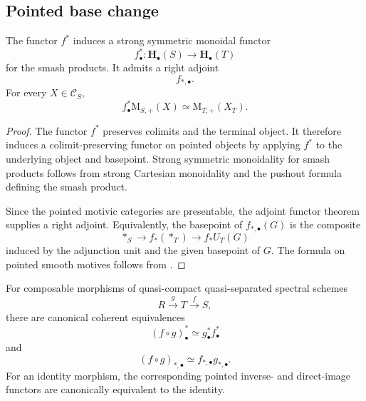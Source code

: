 \subsection{Pointed base change}

\begin{proposition}
\label{prop:pointed-motivic-base-change}
The functor \(f^*\) induces a strong symmetric monoidal functor
\[
    f^*_\bullet
    \colon
    \mathbf H_\bullet(S)
    \longrightarrow
    \mathbf H_\bullet(T)
\]
for the smash products.  It admits a right adjoint
\[
    f_{*,\bullet}.
\]
For every \(X\in\mathcal C_S\),
\[
    f^*_\bullet\mathrm M_{S,+}(X)
    \simeq
    \mathrm M_{T,+}(X_T).
\]
\end{proposition}

\begin{proof}
The functor \(f^*\) preserves colimits and the terminal object.  It
therefore induces a colimit-preserving functor on pointed objects by
applying \(f^*\) to the underlying object and basepoint.  Strong
symmetric monoidality for smash products follows from strong Cartesian
monoidality and the pushout formula defining the smash product.

Since the pointed motivic categories are presentable, the adjoint
functor theorem supplies a right adjoint.  Equivalently, the basepoint
of \(f_{*,\bullet}(G)\) is the composite
\[
    *_S
    \longrightarrow
    f_*(*_T)
    \longrightarrow
    f_*U_T(G)
\]
induced by the adjunction unit and the given basepoint of \(G\).
The formula on pointed smooth motives follows from
.
\end{proof}

\begin{proposition}
\label{prop:pointed-motivic-coherent-base-functoriality}
For composable morphisms of quasi-compact quasi-separated spectral
schemes
\[
    R
    \xrightarrow{g}
    T
    \xrightarrow{f}
    S,
\]
there are canonical coherent equivalences
\[
    (f\circ g)^*_\bullet
    \simeq
    g^*_\bullet f^*_\bullet
\]
and
\[
    (f\circ g)_{*,\bullet}
    \simeq
    f_{*,\bullet}g_{*,\bullet}.
\]
For an identity morphism, the corresponding pointed inverse- and
direct-image functors are canonically equivalent to the identity.
\end{proposition}

